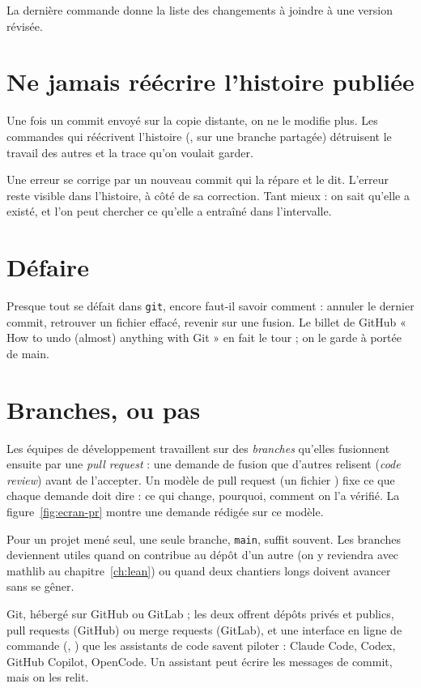 La dernière commande donne la liste des changements à joindre à une version révisée.

\section{Ne jamais réécrire l'histoire publiée}

\begin{warningblock}
Une fois un commit envoyé sur la copie distante, on ne le modifie plus. Les commandes qui
réécrivent l'histoire (,  sur une branche partagée)
détruisent le travail des autres et la trace qu'on voulait garder.
\end{warningblock}

Une erreur se corrige par un nouveau commit qui la répare et le dit. L'erreur reste visible
dans l'histoire, à côté de sa correction. Tant mieux : on sait qu'elle a existé, et l'on
peut chercher ce qu'elle a entraîné dans l'intervalle.

\section{Défaire}

Presque tout se défait dans \texttt{git}, encore faut-il savoir comment : annuler le
dernier commit, retrouver un fichier effacé, revenir sur une fusion. Le billet de GitHub
« How to undo (almost) anything with Git » en fait le tour ; on le garde à portée de main.

\section{Branches, ou pas}

Les équipes de développement travaillent sur des \emph{branches} qu'elles fusionnent
ensuite par une \emph{pull request} : une demande de fusion que d'autres relisent
(\emph{code review}) avant de l'accepter.
Un modèle de pull request (un fichier ) fixe
ce que chaque demande doit dire : ce qui change, pourquoi, comment on l'a vérifié. La
figure~\ref{fig:ecran-pr} montre une demande rédigée sur ce modèle.

 Pour un projet mené seul, une seule branche, \texttt{main}, suffit souvent. Les
branches deviennent utiles quand on contribue au dépôt d'un autre (on y reviendra avec
mathlib au chapitre~\ref{ch:lean}) ou quand deux chantiers longs doivent avancer sans se
gêner.

\begin{outils}
Git, hébergé sur GitHub ou GitLab ; les deux offrent dépôts privés et publics, pull
requests (GitHub) ou merge requests (GitLab), et une interface en ligne de commande (,
) que les assistants de code savent piloter : Claude Code, Codex, GitHub Copilot,
OpenCode. Un assistant peut écrire les messages de commit, mais on les relit.
\end{outils}

